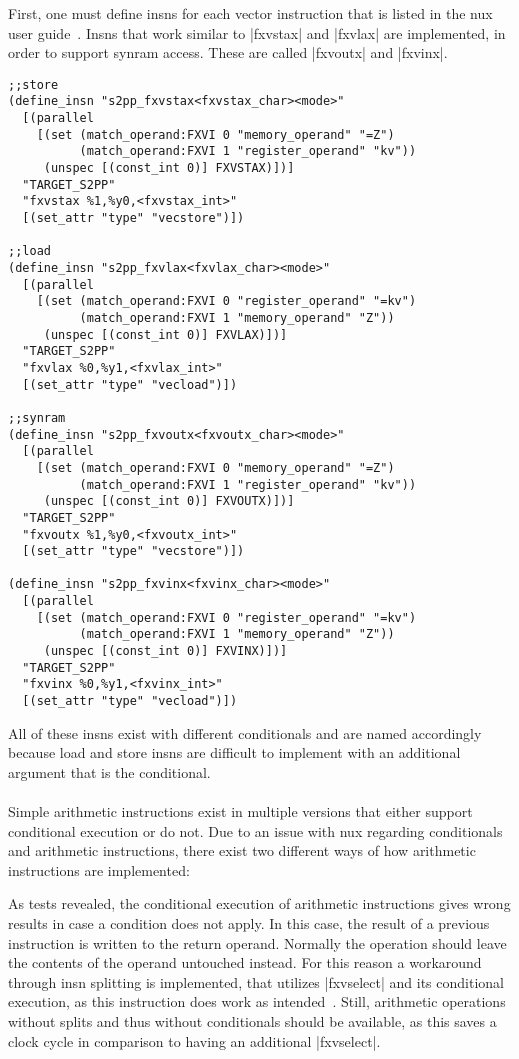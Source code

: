 First, one must define insns for each vector instruction that is listed in the nux user guide~\citep{nuxmanual}.
Insns that work similar to |fxvstax| and |fxvlax| are implemented, in order to support synram access.
These are called |fxvoutx| and |fxvinx|.
\begin{lstlisting}
;;store
(define_insn "s2pp_fxvstax<fxvstax_char><mode>"
  [(parallel
    [(set (match_operand:FXVI 0 "memory_operand" "=Z")
          (match_operand:FXVI 1 "register_operand" "kv"))
     (unspec [(const_int 0)] FXVSTAX)])]
  "TARGET_S2PP"
  "fxvstax %1,%y0,<fxvstax_int>"
  [(set_attr "type" "vecstore")])

;;load
(define_insn "s2pp_fxvlax<fxvlax_char><mode>"
  [(parallel
    [(set (match_operand:FXVI 0 "register_operand" "=kv")
          (match_operand:FXVI 1 "memory_operand" "Z"))
     (unspec [(const_int 0)] FXVLAX)])]
  "TARGET_S2PP"
  "fxvlax %0,%y1,<fxvlax_int>"
  [(set_attr "type" "vecload")])

;;synram
(define_insn "s2pp_fxvoutx<fxvoutx_char><mode>"
  [(parallel
    [(set (match_operand:FXVI 0 "memory_operand" "=Z")
          (match_operand:FXVI 1 "register_operand" "kv"))
     (unspec [(const_int 0)] FXVOUTX)])]
  "TARGET_S2PP"
  "fxvoutx %1,%y0,<fxvoutx_int>"
  [(set_attr "type" "vecstore")])

(define_insn "s2pp_fxvinx<fxvinx_char><mode>"
  [(parallel
    [(set (match_operand:FXVI 0 "register_operand" "=kv")
          (match_operand:FXVI 1 "memory_operand" "Z"))
     (unspec [(const_int 0)] FXVINX)])]
  "TARGET_S2PP"
  "fxvinx %0,%y1,<fxvinx_int>"
  [(set_attr "type" "vecload")])
\end{lstlisting}
All of these insns exist with different conditionals and are named accordingly because load and store insns are difficult to implement with an additional argument that is the conditional.
\\
\\
Simple arithmetic instructions exist in multiple versions that either support conditional execution or do not.
Due to an issue with nux regarding conditionals and arithmetic instructions, there exist two different ways of how arithmetic instructions are implemented:

As tests revealed, the conditional execution of arithmetic instructions gives wrong results in case a condition does not apply.
In this case, the result of a previous instruction is written to the return operand.
Normally the operation should leave the contents of the operand untouched instead.
For this reason a workaround through insn splitting is implemented, that utilizes |fxvselect| and its conditional execution, as this instruction does work as intended~\cite{ppubug}.
Still, arithmetic operations without splits and thus without conditionals should be available, as this saves a clock cycle in comparison to having an additional |fxvselect|.


